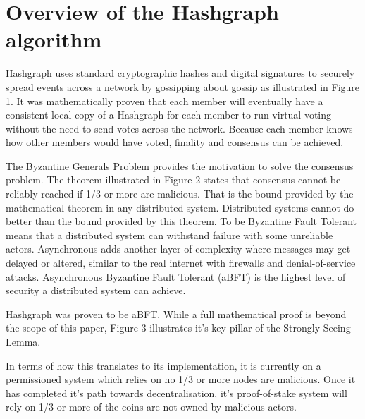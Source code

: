 \section{Overview of the Hashgraph algorithm}



Hashgraph uses standard cryptographic hashes and digital signatures to securely spread events across a network by gossipping about gossip as illustrated in Figure 1. It was mathematically proven that each member will eventually have a consistent local copy of a Hashgraph for each member to run virtual voting without the need to send votes across the network\cite{baird2016}. Because each member knows how other members would have voted, finality and consensus can be achieved.


The Byzantine Generals Problem\cite{shostak1982byzantine} provides the motivation to solve the consensus problem. The theorem illustrated in Figure 2 states that consensus cannot be reliably reached if 1/3 or more are malicious. That is the bound provided by the mathematical theorem in any distributed system. Distributed systems cannot do better than the bound provided by this theorem. To be Byzantine Fault Tolerant means that a distributed system can withstand failure with some unreliable actors. Asynchronous adds another layer of complexity where messages may get delayed or altered, similar to the real internet with firewalls and denial-of-service attacks. Asynchronous Byzantine Fault Tolerant (aBFT) is the highest level of security a distributed system can achieve\cite{coq2018}.


Hashgraph was proven to be aBFT\cite{baird2016}. While a full mathematical proof is beyond the scope of this paper, Figure 3 illustrates it's key pillar of the Strongly Seeing Lemma.

In terms of how this translates to its implementation, it is currently on a permissioned system which relies on no 1/3 or more nodes are malicious. Once it has completed it's path towards decentralisation, it's proof-of-stake system will rely on 1/3 or more of the coins are not owned by malicious actors. 

% 


